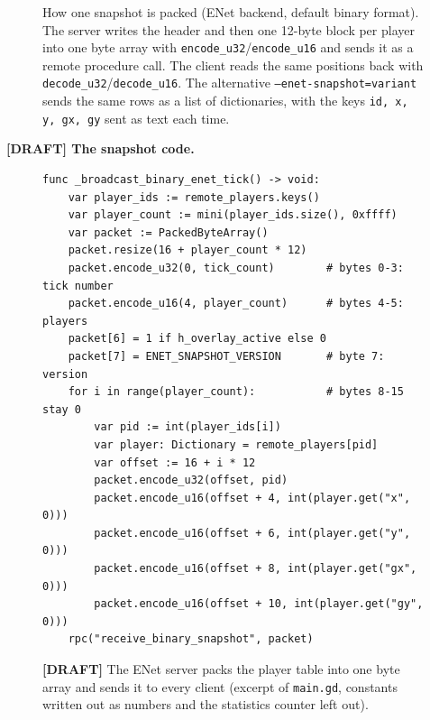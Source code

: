 \begin{figure}[H]
\caption{How one snapshot is packed (ENet backend, default binary format). The server writes the header and then one 12-byte block per player into one byte array with \texttt{encode\_u32}/\texttt{encode\_u16} and sends it as a remote procedure call. The client reads the same positions back with \texttt{decode\_u32}/\texttt{decode\_u16}. The alternative \texttt{--enet-snapshot=variant} sends the same rows as a list of dictionaries, with the keys \texttt{id, x, y, gx, gy} sent as text each time.}
\end{figure}

\newcommand{\draftmark}{\textcolor{red!70!black}{\textbf{[DRAFT]}}}

\noindent\textbf{\draftmark{} The snapshot code.}\par\nobreak
\begin{figure}[H]
\begin{lstlisting}[basicstyle=\ttfamily\scriptsize]
func _broadcast_binary_enet_tick() -> void:
    var player_ids := remote_players.keys()
    var player_count := mini(player_ids.size(), 0xffff)
    var packet := PackedByteArray()
    packet.resize(16 + player_count * 12)
    packet.encode_u32(0, tick_count)        # bytes 0-3: tick number
    packet.encode_u16(4, player_count)      # bytes 4-5: players
    packet[6] = 1 if h_overlay_active else 0
    packet[7] = ENET_SNAPSHOT_VERSION       # byte 7: version
    for i in range(player_count):           # bytes 8-15 stay 0
        var pid := int(player_ids[i])
        var player: Dictionary = remote_players[pid]
        var offset := 16 + i * 12
        packet.encode_u32(offset, pid)
        packet.encode_u16(offset + 4, int(player.get("x", 0)))
        packet.encode_u16(offset + 6, int(player.get("y", 0)))
        packet.encode_u16(offset + 8, int(player.get("gx", 0)))
        packet.encode_u16(offset + 10, int(player.get("gy", 0)))
    rpc("receive_binary_snapshot", packet)
\end{lstlisting}
\caption{\draftmark{} The ENet server packs the player table into one byte array and sends it to every client (excerpt of \texttt{main.gd}, constants written out as numbers and the statistics counter left out).}
\end{figure}




